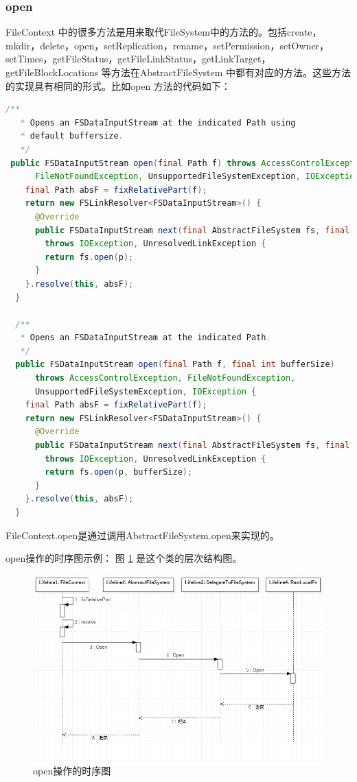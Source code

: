 \subsubsection{open}
FileContext 中的很多方法是用来取代FileSystem中的方法的。包括create，mkdir，delete，open，setReplication，rename，setPermission，setOwner，setTimes，getFileStatus，getFileLinkStatus，getLinkTarget，getFileBlockLocations 等方法在AbstractFileSystem 中都有对应的方法。这些方法的实现具有相同的形式。比如open 方法的代码如下：
\begin{lstlisting}[language=Java]
/**
   * Opens an FSDataInputStream at the indicated Path using
   * default buffersize.
   */
 public FSDataInputStream open(final Path f) throws AccessControlException,
      FileNotFoundException, UnsupportedFileSystemException, IOException {
    final Path absF = fixRelativePart(f);
    return new FSLinkResolver<FSDataInputStream>() {
      @Override
      public FSDataInputStream next(final AbstractFileSystem fs, final Path p)
        throws IOException, UnresolvedLinkException {
        return fs.open(p);
      }
    }.resolve(this, absF);
  }

  /**
   * Opens an FSDataInputStream at the indicated Path.
   */
  public FSDataInputStream open(final Path f, final int bufferSize)
      throws AccessControlException, FileNotFoundException,
      UnsupportedFileSystemException, IOException {
    final Path absF = fixRelativePart(f);
    return new FSLinkResolver<FSDataInputStream>() {
      @Override
      public FSDataInputStream next(final AbstractFileSystem fs, final Path p)
        throws IOException, UnresolvedLinkException {
        return fs.open(p, bufferSize);
      }
    }.resolve(this, absF);
  }
\end{lstlisting}
FileContext.open是通过调用AbstractFileSystem.open来实现的。

open操作的时序图示例：
图 \ref{fig:sequence} 是这个类的层次结构图。
\begin{figure}
\centering
\includegraphics[width=1\linewidth]{UML/abstractfilesystem/sequence.PNG}
\caption{open操作的时序图}
\label{fig:sequence}
\end{figure}

